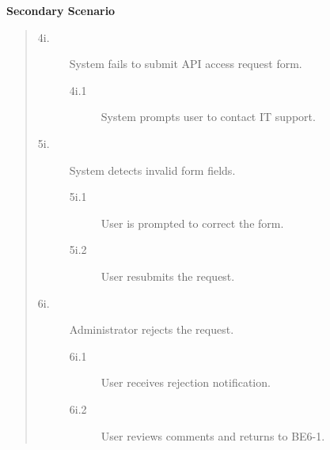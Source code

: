 \documentclass[]{article}
\begin{document}
\begin{enumerate}[{\bf BE7.}]
                \textbf{Secondary Scenario}
                \begin{quote}
                    \begin{description}
                        \item[\textmd{4i.}] System fails to submit API access request form.
                        \begin{description}
                            \item[\textmd{4i.1}] System prompts user to contact IT support.
                        \end{description}

                        \item[\textmd{5i.}] System detects invalid form fields.
                        \begin{description}
                            \item[\textmd{5i.1}] User is prompted to correct the form.
                            \item[\textmd{5i.2}] User resubmits the request.
                        \end{description}

                        \item[\textmd{6i.}] Administrator rejects the request.
                        \begin{description}
                            \item[\textmd{6i.1}] User receives rejection notification.
                            \item[\textmd{6i.2}] User reviews comments and returns to BE6-1.
                        \end{description}
                    \end{description}
                \end{quote}
\end{enumerate}
\end{document}
